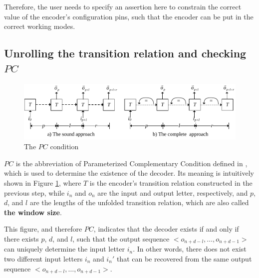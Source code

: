 \documentclass[runningheads,a4paper]{llncs}
\begin{document}
Therefore,
the user needs to specify an assertion here to constrain the correct value of the encoder's configuration pins,
such that the encoder can be put in the correct working modes.


%

\subsection{Unrolling the transition relation and checking $PC$}

\begin{figure}[t]
\begin{center}
\includegraphics[width=\textwidth]{pc}
\end{center}
\caption{The $PC$ condition}
  \label{fig_pc}
\end{figure}

$PC$ is the abbreviation of Parameterized Complementary Condition defined in ,
which is used to determine the existence of the decoder.
Its meaning is intuitively shown in Figure \ref{fig_pc},
where $T$ is the encoder's transition relation constructed in the previous step,
while $i_n$ and $o_n$ are the input and output letter,
respectively,
and $p$, $d$, and $l$ are the lengths of the unfolded transition relation,
which are also called \textbf{the window size}.

This figure,
and therefore $PC$,
indicates that the decoder exists if and only if there exists $p$, $d$, and $l$,
such that the output sequence $<o_{n+d-l},\dots,o_{n+d-1}>$ can uniquely determine the input letter $i_n$.
In other words,
there does not exist two different input letters $i_n$ and $i_n'$ that can be recovered from the same output sequence $<o_{n+d-l},\dots,o_{n+d-1}>$.
\end{document}
